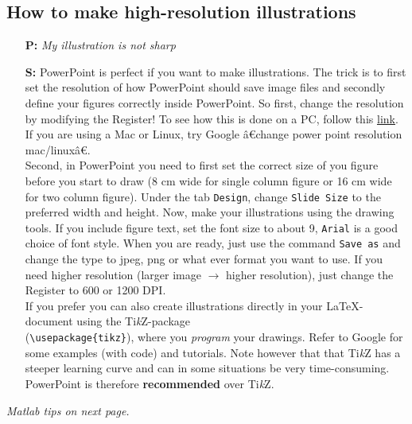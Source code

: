 \documentclass[fleqn,10pt]{SelfArx} %
\begin{document}
\subsection*{How to make high-resolution illustrations}
\begin{enumerate}[nolistsep]
    \item[\textbf{P:}] \textit{My illustration is not sharp}
    \item[\textbf{S:}] PowerPoint is perfect if you want to make illustrations. The trick is to first set the resolution of how PowerPoint should save image files and secondly define your figures correctly inside PowerPoint. So first, change the resolution by modifying the Register! To see how this is done on a PC, follow this \href{https://support.microsoft.com/en-ph/help/827745/how-to-change-the-export-resolution-of-a-powerpoint-slide}{\underline{link}}. If you are using a Mac or Linux, try Google â€change power point resolution mac/linuxâ€.\\
    
    Second, in PowerPoint you need to first set the correct size of you figure before you start to draw (8 cm wide for single column figure or 16 cm wide for two column figure). Under the tab \texttt{Design}, change \texttt{Slide Size} to the preferred width and height. Now, make your illustrations using the drawing tools. If you include figure text, set the font size to about 9, \texttt{Arial} is a good choice of font style. When you are ready, just use the command \texttt{Save as} and change the type to jpeg, png or what ever format you want to use. If you need higher resolution (larger image $\rightarrow$ higher resolution), just change the Register to 600 or 1200 DPI.\\
    
    If you prefer you can also create illustrations directly in your \LaTeX-document using the Ti\textit{k}Z-package \\ (\texttt{\textbackslash usepackage\{tikz\}}), where you \textit{program} your drawings. Refer to Google for some examples (with code) and tutorials. Note however that that Ti\textit{k}Z has a steeper learning curve and can in some situations be very time-consuming. PowerPoint is therefore \textbf{recommended} over Ti\textit{k}Z.
\end{enumerate}
\vfill
\begin{flushright}
\textit{Matlab tips on next page.}
\end{flushright}
\newpage
\end{document}
